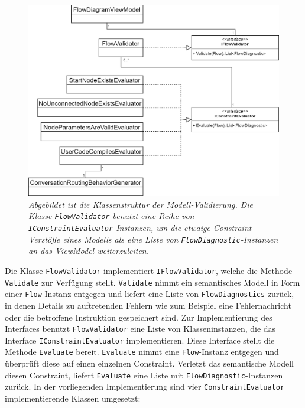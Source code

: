 \begin{figure} %
	\centering
		\includegraphics[width=\textwidth]{img/FlowValidatorClassStructure.png}
	\caption[Klassenstruktur der Modell-Validierung]{\textit{Abgebildet ist die Klassenstruktur der Modell-Validierung. Die Klasse \texttt{FlowValidator} benutzt eine Reihe von \texttt{IConstraintEvaluator}-Instanzen, um die etwaige Constraint-Verstöße eines Modells als eine Liste von \texttt{FlowDiagnostic}-Instanzen an das ViewModel weiterzuleiten.}}
	\label{fig:UML:FlowValidatorClassStructure}
\end{figure}
\noindent Die Klasse \texttt{FlowValidator} implementiert \texttt{IFlowValidator}, welche die Methode \texttt{Validate} zur Verfügung stellt. \texttt{Validate} nimmt ein semantisches Modell in Form einer \texttt{Flow}-Instanz entgegen und liefert eine Liste von \texttt{FlowDiagnostics} zurück, in denen Details zu auftretenden Fehlern wie zum Beispiel eine Fehlernachricht oder die betroffene Instruktion gespeichert sind. Zur Implementierung des Interfaces benutzt \texttt{FlowValidator} eine Liste von Klasseninstanzen, die das Interface \texttt{IConstraintEvaluator} implementieren. Diese Interface stellt die Methode \texttt{Evaluate} bereit. \texttt{Evaluate} nimmt eine \texttt{Flow}-Instanz entgegen und überprüft diese auf einen einzelnen Constraint. Verletzt das semantische Modell diesen Constraint, liefert \texttt{Evaluate} eine Liste mit \texttt{FlowDiagnostic}-Instanzen zurück. In der vorliegenden Implementierung sind vier \texttt{ConstraintEvaluator} implementierende Klassen umgesetzt: 
